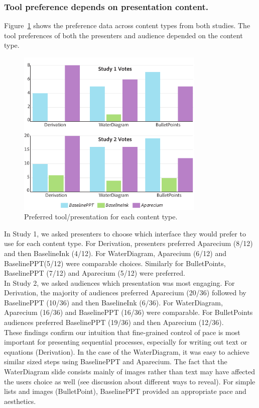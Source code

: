 \subsubsection{Tool preference depends on presentation content.}
Figure~\ref{fig:votes} shows the preference data across content types from both studies. The tool preferences of both the presenters and audience depended on the content type.\\
%
\begin{figure}[h!]
    \centering
        \includegraphics[width=0.8\textwidth]{figures/studyVotes}
        \caption{Preferred tool/presentation for each content type.}
\label{fig:votes}
\end{figure}
%

In Study 1, we asked presenters to choose which interface they would prefer to use for each content type.
For Derivation, presenters preferred  Aparecium (8/12) and then BaselineInk (4/12). For WaterDiagram, Aparecium (6/12) and BaselinePPT(5/12) were comparable choices. Similarly for BulletPoints, BaselinePPT (7/12) and Aparecium (5/12) were preferred.\\
%

In Study 2, we asked audiences which presentation was most engaging. For Derivation, the majority of audiences preferred Aparecium (20/36) followed by BaselinePPT (10/36) and then BaselineInk (6/36). For WaterDiagram, Aparecium (16/36) and BaselinePPT (16/36) were comparable. For BulletPoints audiences preferred BaselinePPT (19/36) and then Aparecium (12/36).\\

These findings confirm our intuition that fine-grained control of pace is most important for presenting sequential processes, especially for writing out text or equations (Derivation). In the case of the WaterDiagram, it was easy to achieve similar sized steps using BaselinePPT and Aparecium. The fact that the WaterDiagram slide consists mainly of images rather than text may have affected the users choice as well (see discussion about different ways to reveal). For simple lists and images (BulletPoint), BaselinePPT provided an appropriate pace and aesthetics.

